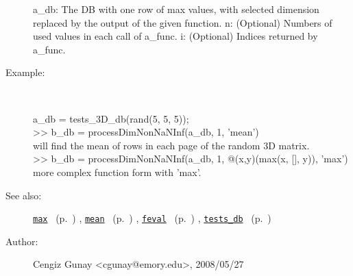 \begin{description}
   a\_db: The DB with one row of max values, with selected dimension
	replaced by the output of the given function.
   n: (Optional) Numbers of used values in each call of a\_func.
   i: (Optional) Indices returned by a\_func.
%
\item[Example:]~
\begin{lyxcode} a\_db = tests\_3D\_db(rand(5, 5, 5));
\\%
 >> b\_db = processDimNonNaNInf(a\_db, 1, 'mean')
\\%
 will find the mean of rows in each page of the random 3D matrix.
\\%
 >> b\_db = processDimNonNaNInf(a\_db, 1, @(x,y)(max(x, [], y)), 'max')
\\%
 more complex function form with 'max'.
\\%
\end{lyxcode}
%
\item[See also:]%
\hyperlink{ref_max}{\texttt{max}}%
\ (p.~\pageref{ref_max})%
%
, \hyperlink{ref_mean}{\texttt{mean}}%
\ (p.~\pageref{ref_mean})%
%
, \hyperlink{ref_feval}{\texttt{feval}}%
\ (p.~\pageref{ref_feval})%
%
, \hyperlink{ref_tests_db}{\texttt{tests\_db}}%
\ (p.~\pageref{ref_tests_db})%
%
%
\item[Author:]%
Cengiz Gunay <cgunay@emory.edu>, 2008/05/27
%
\end{description}
\methodline%
